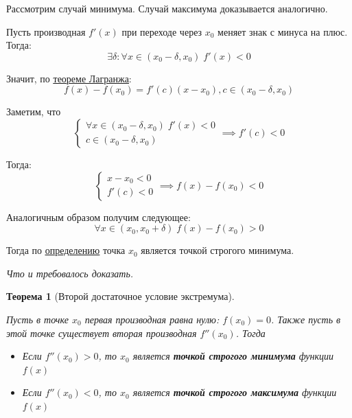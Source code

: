 \documentclass[a4paper,12pt,oneside]{extbook}
\newcommand{\newpar}{$ $\par\nobreak\ignorespaces}
\theoremstyle{numbered}
\theoremstyle{unnumbered}
\theoremstyle{named}
\newtheorem{theorem}{Теорема}[section]
\theoremstyle{unnumbered}
\theoremstyle{named}
\theoremstyle{named}
\theoremstyle{named}
\renewenvironment{proof}[1][]{\breakenv[Доказательство]{\if\relax\detokenize{#1}\relax\else\;\fi}{\textbf{#1}}}{\smallskip\newpar \hfill\textit{Что и требовалось доказать.}}
\newcommand{\plink}[2]{\hyperref[#1]{\color{blue}\underline{#2}}}
\begin{document}
\begin{proof}
    Рассмотрим случай минимума. Случай максимума доказывается аналогично.

    Пусть производная \(f'(x)\) при переходе через \(x_0\) меняет знак с минуса на плюс. Тогда:
    \[
        \exists \delta: \forall x \in (x_0 - \delta, x_0) \; f'(x) < 0
    \]

    Значит, по \plink{theorem:Теорема Лагранжа}{теореме Лагранжа}:
    \[
        f(x) - f(x_0) = f'(c)(x - x_0), c \in (x_0 - \delta, x_0)
    \]

    Заметим, что
    \[
        \begin{cases}
            \forall x \in (x_0 - \delta, x_0) \; f'(x) < 0 \\
            c \in (x_0 - \delta, x_0)
        \end{cases}
        \implies
        f'(c) < 0
    \]

    Тогда:
    \[
        \begin{cases}
            x - x_0 < 0 \\
            f'(c) < 0
        \end{cases}
        \implies
        f(x) - f(x_0) < 0
    \]

    Аналогичным образом получим следующее:
    \[
        \forall x \in (x_0, x_0 + \delta) \; f(x) - f(x_0) > 0
    \]

    Тогда по \plink{def:Локальный минимум и локальный максимум}{определению} точка \(x_0\) является точкой строгого минимума.
\end{proof}

\begin{theorem}[Второй достаточное условие экстремума]
    \newpar
    Пусть в точке \(x_0\) первая производная равна нулю: \(f(x_0) = 0\). Также пусть в этой точке существует вторая производная \(f''(x_0)\). Тогда
    \begin{itemize}
        \item {Если \(f''(x_0) > 0\), то \(x_0\) является \textbf{точкой строгого минимума} функции \(f(x)\)}
        \item {Если \(f''(x_0) < 0\), то \(x_0\) является \textbf{точкой строгого максимума} функции \(f(x)\)}
    \end{itemize}
\end{theorem}
\end{document}
